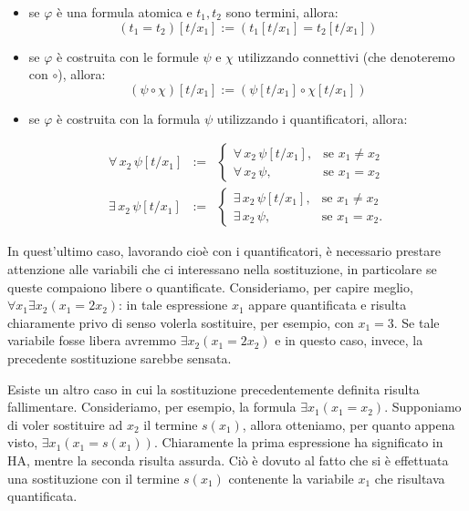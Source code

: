 \begin{itemize}
 \item se $\varphi$ \`e una formula atomica e $t_1,t_2$ sono termini, allora:
$$
(t_1=t_2)[t/x_1] := (t_1[t/x_1]=t_2[t/x_1])
$$

\item se $\varphi$ \`e costruita con le formule $\psi$ e $\chi$ utilizzando connettivi (che denoteremo con $\circ$), allora:
$$
(\psi \circ \chi)[t/x_1] := (\psi[t/x_1]\circ \chi[t/x_1])
$$

\item se $\varphi$ \`e costruita con la formula $\psi$ utilizzando i quantificatori, allora:

\begin{eqnarray*}
 \forall\, x_2\, \psi [t/x_1]  &:=&    \left \{ \begin{array}{ll}
\forall\, x_2\, \psi [t/x_1], & \textrm{se $x_1 \ne x_2$}\\
\forall\, x_2\, \psi, & \textrm{se $x_1 = x_2$}
\end{array}\right.\\
\exists\, x_2\, \psi [t/x_1]  &:=& \left \{ \begin{array}{ll}
\exists\, x_2\, \psi [t/x_1], & \textrm{se $x_1 \ne x_2$}\\
\exists\, x_2\, \psi, & \textrm{se $x_1 = x_2$}.
\end{array}\right.
\end{eqnarray*}

\end{itemize}

In quest'ultimo caso, lavorando cio\`e con i quantificatori, \`e necessario prestare attenzione alle variabili che ci interessano nella sostituzione, in particolare se queste compaiono libere o quantificate. Consideriamo, per capire meglio, $\forall x_1\exists x_2 (x_1=2x_2)$: in tale espressione $x_1$ appare quantificata e risulta chiaramente privo di senso volerla sostituire, per esempio, con $x_1=3$. Se tale variabile fosse libera avremmo $\exists x_2 (x_1=2x_2)$ e in questo caso, invece, la precedente sostituzione sarebbe sensata.

Esiste un altro caso in cui la sostituzione precedentemente definita risulta fallimentare. Consideriamo, per esempio, la formula $\exists x_1(x_1=x_2)$.
Supponiamo di voler sostituire ad $x_2$ il termine $s(x_1)$, allora otteniamo, per quanto appena visto, $\exists x_1(x_1=s(x_1))$.
Chiaramente la prima espressione ha significato in HA, mentre la seconda risulta assurda.
Ci\`o \`e dovuto al fatto che si \`e effettuata una sostituzione con il termine $s(x_1)$ contenente la variabile $x_1$ che risultava quantificata.

